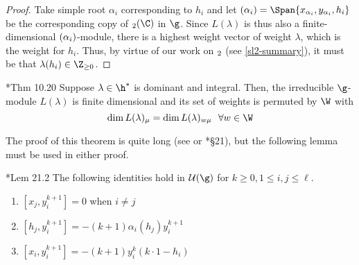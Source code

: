 \documentclass[11pt,leqno,oneside]{amsart}
\numberwithin{thm}{section}
\newcommand{\U}{\mathcal{U}}
\begin{document}
\begin{proof}
  Take simple root \(\alpha_i\) corresponding to \(h_i\) and let
  \(\sl(\alpha_i) = 
  \Span\{x_{\alpha_i}, y_{\alpha_i}, h_i\}\) be the
  corresponding copy of \(\sl_2(\C)\) in \(\g\). Since \(L(\lambda)\)
  is thus also a finite-dimensional \(\sl(\alpha_i)\)-module, there is
  a highest weight vector of weight \(\lambda\), which is the weight
  for \(h_i\). Thus, by virtue of our work on \(\sl_2\) (see
  \ref{sl2-summary}), it must 
  be that \(\lambda(h_i) \in \Z_{\geq 0}\).
\end{proof}
\begin{thm}\label{dominant-integral-fd-modules}
  \cite{carter}*{Thm 10.20} Suppose \(\lambda \in \h^*\) is dominant
  and integral. Then, the 
  irreducible \(\g\)-module \(L(\lambda)\) is finite dimensional and
  its set of weights is permuted by \(\W\) with \[
    \dim L(\lambda)_\mu = \dim L(\lambda)_{w \mu} \ \ \forall w
    \in \W
  \]
\end{thm}
The proof of this theorem is quite long (see \cite{carter} or
\cite{humph}*{\S 21}), but the following lemma must be used in either
proof. 
\begin{lem}
  \cite{humph}*{Lem 21.2} The following identities hold in \(\U(\g)\)
  for \(k \geq 0, 1 \leq 
  i,j \leq \ell\).
  \begin{enumerate}
  \item \([x_j, y_i^{k+1}] = 0\) when \(i \neq j\)
  \item \([h_j, y_i^{k+1}] = -(k+1)\alpha_i(h_j)y_i^{k+1}\)
  \item \([x_i, y_i^{k+1}] = -(k+1)y_i^k(k \cdot 1 - h_i)\)
  \end{enumerate}
\end{lem}
\end{document}
